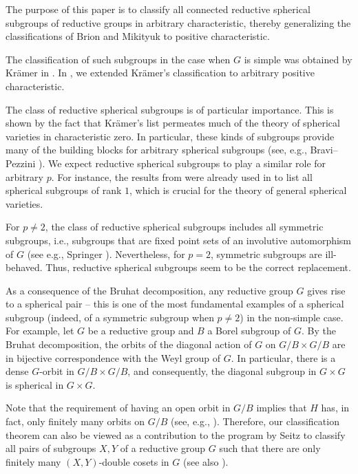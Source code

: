 \documentclass[12pt]{amsart}
\numberwithin{equation}{section}
\theoremstyle{definition}
\begin{document}
The purpose of this paper is to classify all connected reductive
spherical subgroups of reductive groups in arbitrary
characteristic, thereby generalizing the classifications of Brion
\cite{Bri87} and Mikityuk \cite[\S 5]{mik} to positive characteristic.

The classification of such subgroups in the case when $G$ is simple
was obtained by Krämer in \cite{Kr}.  In \cite{KR}, we extended
Krämer's classification to arbitrary positive characteristic.

The class of reductive spherical subgroups is of particular
importance. This is shown by the fact that Krämer's list permeates
much of the theory of spherical varieties in characteristic zero. In
particular, these kinds of subgroups provide many of the building
blocks for arbitrary spherical subgroups (see, e.g., Bravi--Pezzini
\cite{BrPezz}). We expect reductive spherical subgroups to play a
similar role for arbitrary $p$. For instance, the results from
\cite{KR} were already used in \cite{Knop5} to list all spherical
subgroups of rank $1$, which is crucial for the theory of general
spherical varieties.

For $p\ne2$, the class of reductive spherical subgroups includes all
symmetric subgroups, i.e., subgroups that are fixed point sets of an
involutive automorphism of $G$ (see e.g., Springer \cite{springer}).
Nevertheless, for $p=2$, symmetric subgroups are ill-behaved. Thus,
reductive spherical subgroups seem to be the correct replacement.

As a consequence of the Bruhat decomposition, any reductive group $G$
gives rise to a spherical pair -- this is one of the most fundamental examples
of a spherical subgroup (indeed, of a symmetric subgroup when
$p \ne 2$) in the non-simple case.  For example, let $G$ be a
reductive group and $B$ a Borel subgroup of $G$.  By the Bruhat
decomposition, the orbits of the diagonal action of $G$ on $G/B \times G/B$
are in bijective correspondence with the Weyl group of $G$.  In
particular, there is a dense $G$-orbit in $G/B \times G/B$, and
consequently, the diagonal subgroup in $G \times G$ is spherical in
$G \times G$.

Note that the requirement of having an open orbit in $G/B$ implies
that $H$ has, in fact, only finitely many orbits on $G/B$ (see, e.g.,
\cite{Knop3}). Therefore, our classification theorem can also be
viewed as a contribution to the program by Seitz \cite{Seitz} to
classify all pairs of subgroups $X,Y$ of a reductive group $G$ such
that there are only finitely many $(X,Y)$-double cosets in $G$ (see
also \cite{Br}).
\end{document}
